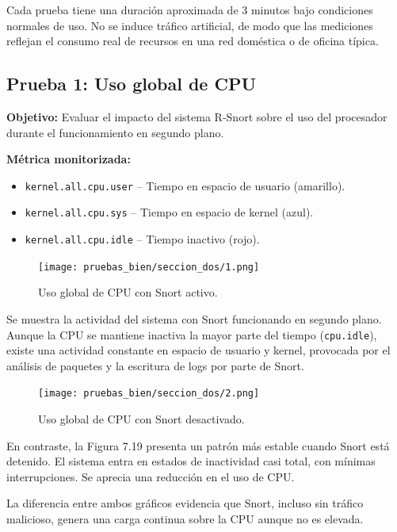 \documentclass[11pt,a4paper,twoside]{report}
\begin{document}
Cada prueba tiene una duración aproximada de 3 minutos bajo condiciones normales de uso. No se induce tráfico artificial, de modo que las mediciones reflejan el consumo real de recursos en una red doméstica o de oficina típica.

\bigskip

\subsection*{Prueba 1: Uso global de CPU}

\textbf{Objetivo:}  
Evaluar el impacto del sistema R-Snort sobre el uso del procesador durante el funcionamiento en segundo plano.\newline

\textbf{Métrica monitorizada:}
\begin{itemize}
	\item \texttt{kernel.all.cpu.user} – Tiempo en espacio de usuario (amarillo).
	\item \texttt{kernel.all.cpu.sys} – Tiempo en espacio de kernel (azul).
	\item \texttt{kernel.all.cpu.idle} – Tiempo inactivo (rojo).
\end{itemize}

\begin{figure}[H]
	\centering
	\texttt{[image: pruebas\_bien/seccion\_dos/1.png]}
	\caption{Uso global de CPU con Snort activo.}
\end{figure}

Se muestra la actividad del sistema con Snort funcionando en segundo plano. Aunque la CPU se mantiene inactiva la mayor parte del tiempo (\texttt{cpu.idle}), existe una actividad constante en espacio de usuario y kernel, provocada por el análisis de paquetes y la escritura de logs por parte de Snort.

\begin{figure}[H]
	\centering
	\texttt{[image: pruebas\_bien/seccion\_dos/2.png]}
	\caption{Uso global de CPU con Snort desactivado.}
\end{figure}

En contraste, la Figura 7.19 presenta un patrón más estable cuando Snort está detenido. El sistema entra en estados de inactividad casi total, con mínimas interrupciones. Se aprecia una reducción en el uso de CPU.\newline

La diferencia entre ambos gráficos evidencia que Snort, incluso sin tráfico malicioso, genera una carga continua sobre la CPU aunque no es elevada.
\end{document}
